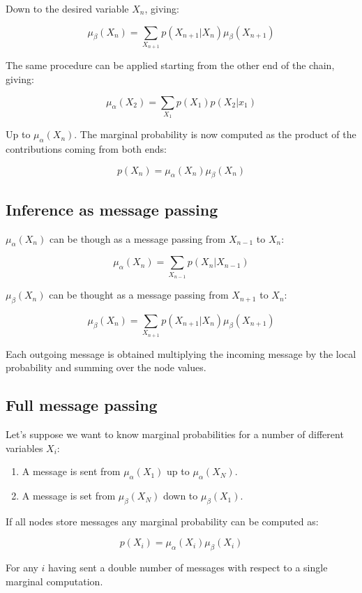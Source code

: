 	Down to the desired variable $X_n$, giving:

	$$\mu_\beta(X_{n}) = \sum\limits_{X_{n+1}}p(X_{n+1}|X_{n})\mu_\beta(X_{n+1})$$

	The same procedure can be applied starting from the other end of the chain, giving:

	$$\mu_\alpha(X_2) = \sum\limits_{X_1}p(X_1)p(X_2|x_1)$$

	Up to $\mu_\alpha(X_n)$.
	The marginal probability is now computed as the product of the contributions coming from both ends:

	$$p(X_n) = \mu_\alpha(X_n)\mu_\beta(X_n)$$

	\subsection{Inference as message passing}
	$\mu_\alpha(X_n)$ can be though as a message passing from $X_{n-1}$ to $X_n$:

	$$\mu_\alpha(X_n) = \sum\limits_{X_{n-1}} p(X_n|X_{n-1})$$

	$\mu_\beta(X_n)$ can be thought as a message passing from $X_{n+1}$ to $X_n$:

	$$\mu_\beta(X_n) = \sum\limits_{X_{n+1}}p(X_{n+1}|X_n)\mu_\beta(X_{n+1})$$

	Each outgoing message is obtained multiplying the incoming message by the local probability and summing over the node values.

	\subsection{Full message passing}
	Let's suppose we want to know marginal probabilities for a number of different variables $X_i$:

	\begin{multicols}{2}
		\begin{enumerate}
			\item A message is sent from $\mu_\alpha(X_1)$ up to $\mu_\alpha(X_N)$.
			\item A message is set from $\mu_\beta(X_N)$ down to $\mu_\beta(X_1)$.
		\end{enumerate}
	\end{multicols}

	If all nodes store messages any marginal probability can be computed as:

	$$p(X_i) = \mu_\alpha(X_i)\mu_\beta(X_i)$$

	For any $i$ having sent a double number of messages with respect to a single marginal computation.

